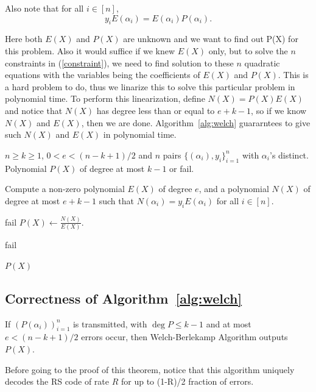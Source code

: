 Also note that for all $i\in[n]$, 
\begin{equation}\label{constraint}
y_iE(\alpha_i) = E(\alpha_i)P(\alpha_i).
\end{equation}

Here both $E(X)$ and $P(X)$ are unknown and we want to find out P(X) for this problem. Also it would suffice if we knew $E(X)$ only, but to solve the $n$ constraints in (\ref{constraint}), we need to find solution to these $n$ quadratic equations with the variables being the coefficients of $E(X)$ and $P(X)$. This is a hard problem to do, thus we linarize this to solve this particular problem in polynomial time.  To perform this linearization, define $N(X) = P(X)E(X)$ and notice that $N(X)$ has degree less than or equal to $e+k-1$, so if we know $N(X)$ and $E(X)$, then we are done. Algorithm~\ref{alg:welch} guararntees to give such $N(X)$ and $E(X)$ in polynomial time.

\begin{algorithm}\label{alg:welch}
	\caption{\large Welch-Berlekamp Algortihm}
	\begin{algorithmic}[1]
		\large
		\Input $n\geq k\geq 1$, $0<e<(n-k+1)/2$ and $n$ pairs $\{(\alpha_i),y_i\}_{i=1}^n$ with $\alpha_i$'s distinct.
		\Output Polynomial $P(X)$ of degree at most $k-1$ or fail.
		
		\State Compute a non-zero polynomial $E(X)$ of degree $e$, and a polynomial $N(X)$ of degree at most $e+k-1$ such that $N(\alpha_i) = y_iE(\alpha_i)$ for all $i\in[n]$.	
		
		\State	\Return fail
		\EndIf
		\State $P(X)\leftarrow \frac{N(X)}{E(X)}$.
		
	\State	\Return fail
		\Else
		
		\State\Return $P(X)$
	   \EndIf
	\end{algorithmic}
\end{algorithm}

\subsection*{Correctness of Algorithm~\ref{alg:welch}}

\begin{theorem}[]
	If $(P(\alpha_i))_{i=1}^n$ is transmitted, with $\deg P\leq k-1$ and at most $e<(n-k+1)/2$ errors occur, then Welch-Berlekamp Algorithm outputs $P(X)$. 
	
\end{theorem}
Before going to the proof of this theorem, notice that this algorithm uniquely decodes the RS code of rate $R$ for up to (1-R)/2 fraction of errors.
	
